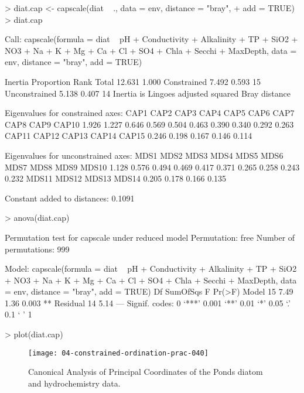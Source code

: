 \documentclass[a4paper,10pt]{article}
\begin{document}
\begin{Schunk}
\begin{Sinput}
> diat.cap <- capscale(diat ~ ., data = env, distance = "bray",
+                      add = TRUE)
> diat.cap
\end{Sinput}
\begin{Soutput}
Call: capscale(formula = diat ~ pH + Conductivity +
Alkalinity + TP + SiO2 + NO3 + Na + K + Mg + Ca + Cl +
SO4 + Chla + Secchi + MaxDepth, data = env, distance =
"bray", add = TRUE)

              Inertia Proportion Rank
Total          12.631      1.000     
Constrained     7.492      0.593   15
Unconstrained   5.138      0.407   14
Inertia is Lingoes adjusted squared Bray distance 

Eigenvalues for constrained axes:
 CAP1  CAP2  CAP3  CAP4  CAP5  CAP6  CAP7  CAP8  CAP9 CAP10 
1.926 1.227 0.646 0.569 0.504 0.463 0.390 0.340 0.292 0.263 
CAP11 CAP12 CAP13 CAP14 CAP15 
0.246 0.198 0.167 0.146 0.114 

Eigenvalues for unconstrained axes:
 MDS1  MDS2  MDS3  MDS4  MDS5  MDS6  MDS7  MDS8  MDS9 MDS10 
1.128 0.576 0.494 0.469 0.417 0.371 0.265 0.258 0.243 0.232 
MDS11 MDS12 MDS13 MDS14 
0.205 0.178 0.166 0.135 

Constant added to distances: 0.1091 
\end{Soutput}
\begin{Sinput}
> anova(diat.cap)
\end{Sinput}
\begin{Soutput}
Permutation test for capscale under reduced model
Permutation: free
Number of permutations: 999

Model: capscale(formula = diat ~ pH + Conductivity + Alkalinity + TP + SiO2 + NO3 + Na + K + Mg + Ca + Cl + SO4 + Chla + Secchi + MaxDepth, data = env, distance = "bray", add = TRUE)
         Df SumOfSqs    F Pr(>F)   
Model    15     7.49 1.36  0.003 **
Residual 14     5.14               
---
Signif. codes:  0 ‘***’ 0.001 ‘**’ 0.01 ‘*’ 0.05 ‘.’ 0.1 ‘ ’ 1
\end{Soutput}
\begin{Sinput}
> plot(diat.cap)
\end{Sinput}
\end{Schunk}

\begin{figure}[t]
\begin{center}
\texttt{[image: 04-constrained-ordination-prac-040]}
\caption{\label{cap_triplot}Canonical Analysis of Principal Coordinates of the Ponds diatom and hydrochemistry data.}
\end{center}
\end{figure}
\end{document}
